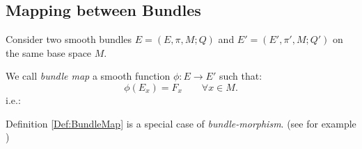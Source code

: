 \documentclass[Main]{subfiles}
\begin{document}
		\subsection{Mapping between Bundles}
			Consider two smooth bundles $E=(E,\pi,M; Q)$ and $E'=(E',\pi',M; Q')$ on the same base space $M$.
			\begin{definition}\label{Def:BundleMap}
				We call \emph{bundle map} a smooth function $\phi: E \rightarrow E'$ such that:			
			 	\begin{displaymath}
			 		\phi(E_{x})= F_{x} \qquad \forall x \in M.
			 	\end{displaymath}
				i.e.:
				
				\centering
			\end{definition}
			\begin{observation}
				Definition \ref{Def:BundleMap} is a special case of \emph{bundle-morphism}. (see for example \cite{G.Sardanashvily2013})
			\end{observation}
\end{document}
